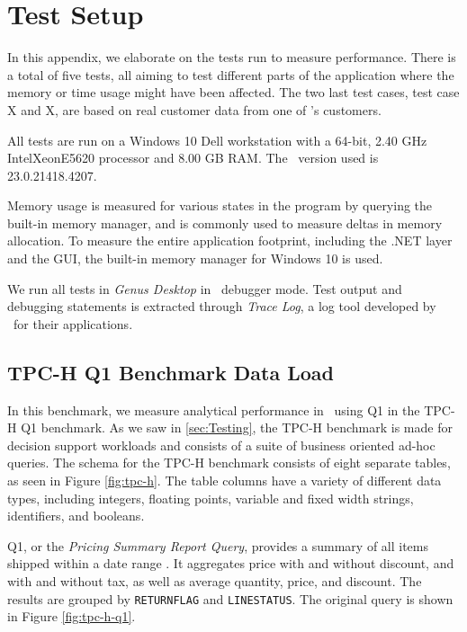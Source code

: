 \chapter{Test Setup}
\label{app:test-setup}
In this appendix, we elaborate on the tests run to measure performance. There is a total of five tests, all aiming to test different parts of the application where the memory or time usage might have been affected. The two last test cases, test case X and X, are based on real customer data from one of \genus's customers.

All tests are run on a Windows 10 Dell workstation with a 64-bit, 2.40 GHz Intel\textregistered Xeon\textregistered E5620 processor and 8.00 GB RAM. The \delphi~version used is 23.0.21418.4207. 

Memory usage is measured for various states in the program by querying the built-in  memory manager, and is commonly used to measure deltas in memory allocation. To measure the entire application footprint, including the .NET layer and the GUI, the built-in memory manager for Windows 10 is used.

We run all tests in \textit{Genus Desktop} in \delphi~debugger mode. Test output and debugging statements is extracted through \textit{Trace Log}, a log tool developed by \genus~for their applications.


\section{TPC-H Q1 Benchmark Data Load}
\label{sec:TPC-H Q1 Benchmark Data Load}
In this benchmark, we measure analytical performance in \gap~using Q1 in the TPC-H Q1 benchmark. As we saw in \ref{sec:Testing}, the TPC-H benchmark is made for decision support workloads and consists of a suite of business oriented ad-hoc queries. The schema for the TPC-H benchmark consists of eight separate tables, as seen in Figure \ref{fig:tpc-h}. The table columns have a variety of different data types, including integers, floating points, variable and fixed width strings, identifiers, and booleans. 

Q1, or the \textit{Pricing Summary Report Query}, provides a summary of all items shipped within a date range \cite{Transaction_Processing_Performance_Council_TPC2014-ux}. It aggregates price with and without discount, and with and without tax, as well as average quantity, price, and discount. The results are grouped by \texttt{RETURNFLAG} and \texttt{LINESTATUS}. The original query is shown in Figure \ref{fig:tpc-h-q1}.

